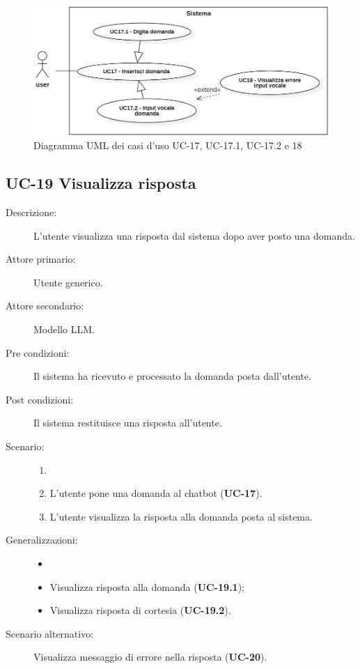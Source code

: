 \begin{figure}[H]
    \centering
    \includegraphics[width=\linewidth]{UC17}
    \caption{Diagramma UML dei casi d'uso UC-17, UC-17.1, UC-17.2 e 18}
    \label{fig:UC16-17}
\end{figure}

\subsection{UC-19 Visualizza risposta}
\begin{description}
    \item[Descrizione:] L'utente visualizza una risposta dal sistema dopo aver posto una domanda.
    \item[Attore primario:] Utente generico.
    \item[Attore secondario:] Modello LLM. 
    \item[Pre condizioni:] Il sistema ha ricevuto e processato la domanda posta dall'utente.
    \item[Post condizioni:] Il sistema restituisce una risposta all'utente.
    \newpage
    \item[Scenario:]
    \begin{enumerate}
        \item[]
        \item L’utente pone una domanda al chatbot (\textbf{UC-17}).
        \item L'utente visualizza la risposta alla domanda posta al sistema.
    \end{enumerate}
    \item[Generalizzazioni:]
    \begin{itemize}
        \item[] 
        \item Visualizza risposta alla domanda (\textbf{UC-19.1});
        \item Visualizza risposta di cortesia (\textbf{UC-19.2}).
    \end{itemize}
    \item[Scenario alternativo:] Visualizza messaggio di errore nella risposta (\textbf{UC-20}).
\end{description}

